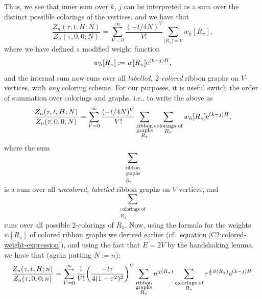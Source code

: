\documentclass[pdftex]{sigma}
\numberwithin{equation}{section}
\begin{document}
Thus, we see that inner sum over $k$, $j$ can be interpreted as a sum over the distinct possible colorings of the vertices, and we have that
 \begin{equation*}
 \frac{Z_n(\tau,t,H;N)}{Z_n(\tau,0,0;N)} = \sum_{V = 0}^{\infty}\frac{(-t/4N)^V}{V!}\sum_{|R_{\pi}| = V} w_h[R_{\pi}],
 \end{equation*}
where we have defined a modified weight function
 \begin{equation*}
 w_h[R_{\pi}] := w[R_{\pi}]{\rm e}^{(k-j)H},
 \end{equation*}
and the internal sum now runs over all \textit{labelled, $2$-colored} ribbon graphs on $V$-vertices, with \textit{any} coloring scheme.
For our purposes, it is useful switch the order of summation over colorings and graphs, i.e., to write the above as
 \begin{equation*}
 \frac{Z_n(\tau,t,H;N)}{Z_n(\tau,0,0;N)} = \sum_{V = 0}^{\infty}\frac{(-t/4N)^V}{V!}\sum_{\substack{\text{ribbon}\\\text{graphs}\\ R_{\pi} }}\sum_{\substack{\text{colorings of} \\ R_{\pi} }} w_h[R_{\pi}] {\rm e}^{(k-j)H},
 \end{equation*}
where the sum
 \begin{equation*}
 \sum_{\substack{\text{ribbon}\\\text{graphs}\\ R_{\pi} }}
 \end{equation*}
is a sum over all \textit{uncolored, labelled} ribbon graphs on $V$ vertices, and
 \begin{equation*}
 \sum_{\substack{\text{colorings of} \\ R_{\pi} }}
 \end{equation*}
runs over all possible $2$-colorings of $R_{\pi}$. Now, using the formula for the weights $w[R_{\pi}]$ of colored ribbon graphs
we derived earlier (cf.\ equation \eqref{C2:colored-weight-expression}), and using the fact that $E = 2V$ by the handshaking lemma, we have that
(again putting $N := n$):
 \begin{equation*}
 \frac{Z_n(\tau,t,H;n)}{Z_n(\tau,0,0;n)} = \sum_{V = 0}^{\infty}\frac{1}{V!} \biggl(\frac{-t\tau}{4(1-\tau^2)^2}\biggr)^V\sum_{\substack{\text{ribbon}\\\text{graphs}\\ R_{\pi} }} n^{\chi(R_{\pi})}\sum_{\substack{\text{colorings of} \\ R_{\pi} }} \tau^{\frac{1}{2} S(R_{\pi})} {\rm e}^{(k-j)H}.
 \end{equation*}
\end{document}
